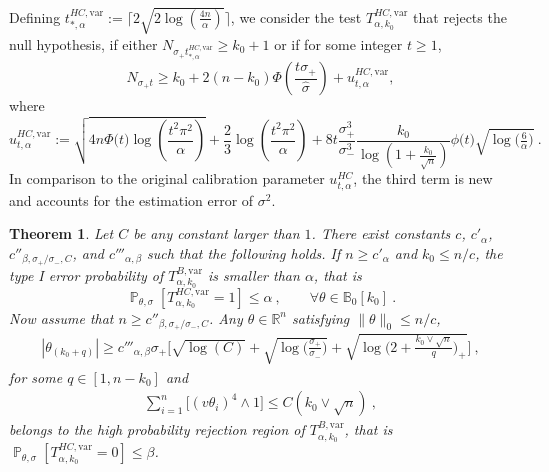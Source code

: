 \documentclass[twoside,11pt]{article}
\newtheorem{thm}{Theorem}
\def\beq{\begin{equation}}
\def\eeq{\end{equation}}
\renewcommand{\P}{\operatorname{\mathbb{P}}}
\newcommand{\<}{\langle}
\renewcommand{\>}{\rangle}
\begin{document}
Defining $t_{*,\alpha}^{HC,\mathrm{var}}:= \lceil 2 \sqrt{2\log(\frac{4n}{\alpha})} \rceil$, we 
consider the test $T^{HC,\mathrm{var}}_{\alpha,k_0}$ that rejects the null hypothesis, if either $N_{\sigma_+ t_{*,\alpha}^{HC,\mathrm{var}}}\geq k_0+1$ or if for some integer $t \geq  1$, 
\beq\label{eq:rejection_HC_ad}
N_{\sigma_+ t}\geq  k_0 +2(n-k_0)\Phi(\frac{t \sigma_+}{\hat \sigma})+ u_{t,\alpha}^{HC,\mathrm{var}},
\eeq
where 
\beq\label{eq:rejection_Ntuv}
   u_{t,\alpha}^{HC,\mathrm{var}} :=  \sqrt{4n\Phi\big(t\big)\log\left(\frac{t^2\pi^2}{\alpha}\right)} + \frac{2}{3}\log\left(\frac{t^2\pi^2}{\alpha}\right) +  8 t\frac{\sigma_+^3}{\sigma_-^3}\frac{k_0}{\log(1+\frac{k_0}{\sqrt{n}})}\phi\big(t\big) \sqrt{\log\big(\tfrac{6}{\alpha}\big)}\ .
\eeq
In comparison to the original calibration parameter $u_{t,\alpha}^{HC}$, the third term is new and accounts for the estimation error of $\sigma^2$. 

\begin{thm}\label{thm:HCuv}
Let $C$ be any constant larger than $1$. There exist constants $c$, $c'_{\alpha}$, $c''_{\beta,\sigma_+/\sigma_{-},C}$, and 
$c'''_{\alpha,\beta}$ such that the following holds. 
If $n\geq c'_{\alpha}$ and $k_0\leq n/c$, the type I error probability of $T^{B,\mathrm{var}}_{\alpha,k_0}$ is smaller than $\alpha$, that is 
\[
 \P_{\theta,\sigma}[T^{HC,\mathrm{var}}_{\alpha,k_0}=1]\leq \alpha \ , \quad \quad \forall \theta\in\mathbb{B}_0[k_0]\ . 
\]
Now assume that $n\geq c''_{\beta,\sigma_+/\sigma_{-},C}$.
Any $\theta\in \mathbb{R}^n$ satisfying $\|\theta\|_0\leq n/c$,
\begin{align}\label{the:cond2}
|\theta_{(k_0+q)}| \geq c'''_{\alpha,\beta}\sigma_+  \Big[\sqrt{\log(C)}+ \sqrt{\log\big(\tfrac{\sigma_+}{\sigma_{-}}\big)}+ \sqrt{\log\Big(2+ \tfrac{k_0\vee \sqrt{n}}{q}\Big)_+}\Big]\ ,
\end{align}
 for  some $q\in [1,n-k_0]$ and 
\begin{align}\label{eq:assu:cond2def}
\sum_{i=1}^n \big[(v\theta_i)^4\wedge 1\big]\leq  C (k_0\lor \sqrt{n})\ ,
\end{align}
belongs to the high probability rejection region of $T^{B,\mathrm{var}}_{\alpha,k_0}$, that is 
$\P_{\theta,\sigma}[T^{HC,\mathrm{var}}_{\alpha,k_0}=0]\leq \beta$.
\end{thm}
\end{document}
